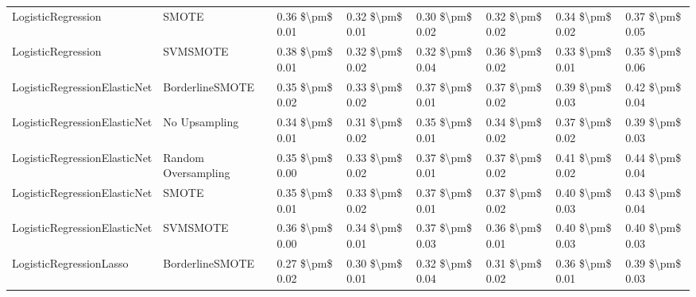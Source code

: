 \begin{tabular}{llllllll}
             LogisticRegression &                         SMOTE & 0.36 \$\textbackslash pm\$ 0.01 &           0.32 \$\textbackslash pm\$ 0.01 &       0.30 \$\textbackslash pm\$ 0.02 &        0.32 \$\textbackslash pm\$ 0.02 &                         0.34 \$\textbackslash pm\$ 0.02 &     0.37 \$\textbackslash pm\$ 0.05 \\
             LogisticRegression &                      SVMSMOTE & 0.38 \$\textbackslash pm\$ 0.01 &           0.32 \$\textbackslash pm\$ 0.02 &       0.32 \$\textbackslash pm\$ 0.04 &        0.36 \$\textbackslash pm\$ 0.02 &                         0.33 \$\textbackslash pm\$ 0.01 &     0.35 \$\textbackslash pm\$ 0.06 \\
   LogisticRegressionElasticNet &               BorderlineSMOTE & 0.35 \$\textbackslash pm\$ 0.02 &           0.33 \$\textbackslash pm\$ 0.02 &       0.37 \$\textbackslash pm\$ 0.01 &        0.37 \$\textbackslash pm\$ 0.02 &                         0.39 \$\textbackslash pm\$ 0.03 &     0.42 \$\textbackslash pm\$ 0.04 \\
   LogisticRegressionElasticNet &                 No Upsampling & 0.34 \$\textbackslash pm\$ 0.01 &           0.31 \$\textbackslash pm\$ 0.02 &       0.35 \$\textbackslash pm\$ 0.01 &        0.34 \$\textbackslash pm\$ 0.02 &                         0.37 \$\textbackslash pm\$ 0.02 &     0.39 \$\textbackslash pm\$ 0.03 \\
   LogisticRegressionElasticNet &           Random Oversampling & 0.35 \$\textbackslash pm\$ 0.00 &           0.33 \$\textbackslash pm\$ 0.02 &       0.37 \$\textbackslash pm\$ 0.01 &        0.37 \$\textbackslash pm\$ 0.02 &                         0.41 \$\textbackslash pm\$ 0.02 &     0.44 \$\textbackslash pm\$ 0.04 \\
   LogisticRegressionElasticNet &                         SMOTE & 0.35 \$\textbackslash pm\$ 0.01 &           0.33 \$\textbackslash pm\$ 0.02 &       0.37 \$\textbackslash pm\$ 0.01 &        0.37 \$\textbackslash pm\$ 0.02 &                         0.40 \$\textbackslash pm\$ 0.03 &     0.43 \$\textbackslash pm\$ 0.04 \\
   LogisticRegressionElasticNet &                      SVMSMOTE & 0.36 \$\textbackslash pm\$ 0.00 &           0.34 \$\textbackslash pm\$ 0.01 &       0.37 \$\textbackslash pm\$ 0.03 &        0.36 \$\textbackslash pm\$ 0.01 &                         0.40 \$\textbackslash pm\$ 0.03 &     0.40 \$\textbackslash pm\$ 0.03 \\
        LogisticRegressionLasso &               BorderlineSMOTE & 0.27 \$\textbackslash pm\$ 0.02 &           0.30 \$\textbackslash pm\$ 0.01 &       0.32 \$\textbackslash pm\$ 0.04 &        0.31 \$\textbackslash pm\$ 0.02 &                         0.36 \$\textbackslash pm\$ 0.01 &     0.39 \$\textbackslash pm\$ 0.03 \\

\end{tabular}
